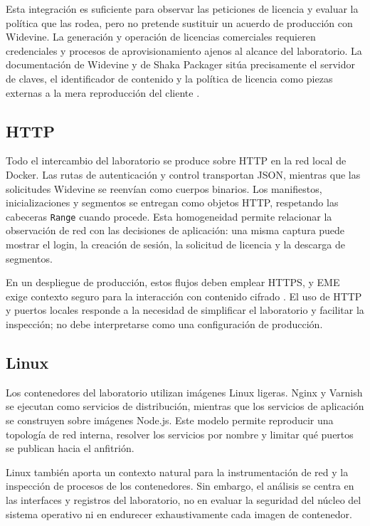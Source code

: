 Esta integración es suficiente para observar las peticiones de licencia y evaluar la política que las rodea, pero no pretende sustituir un acuerdo de producción con Widevine. La generación y operación de licencias comerciales requieren credenciales y procesos de aprovisionamiento ajenos al alcance del laboratorio. La documentación de Widevine y de Shaka Packager sitúa precisamente el servidor de claves, el identificador de contenido y la política de licencia como piezas externas a la mera reproducción del cliente \cite{widevine2024,shaka-packager-drm}.

\subsection{HTTP}

Todo el intercambio del laboratorio se produce sobre HTTP en la red local de Docker. Las rutas de autenticación y control transportan JSON, mientras que las solicitudes Widevine se reenvían como cuerpos binarios. Los manifiestos, inicializaciones y segmentos se entregan como objetos HTTP, respetando las cabeceras \nolinkurl{Range} cuando procede. Esta homogeneidad permite relacionar la observación de red con las decisiones de aplicación: una misma captura puede mostrar el login, la creación de sesión, la solicitud de licencia y la descarga de segmentos.

En un despliegue de producción, estos flujos deben emplear HTTPS, y EME exige contexto seguro para la interacción con contenido cifrado \cite{w3ceme2026}. El uso de HTTP y puertos locales responde a la necesidad de simplificar el laboratorio y facilitar la inspección; no debe interpretarse como una configuración de producción.

\subsection{Linux}

Los contenedores del laboratorio utilizan imágenes Linux ligeras. Nginx y Varnish se ejecutan como servicios de distribución, mientras que los servicios de aplicación se construyen sobre imágenes Node.js. Este modelo permite reproducir una topología de red interna, resolver los servicios por nombre y limitar qué puertos se publican hacia el anfitrión.

Linux también aporta un contexto natural para la instrumentación de red y la inspección de procesos de los contenedores. Sin embargo, el análisis se centra en las interfaces y registros del laboratorio, no en evaluar la seguridad del núcleo del sistema operativo ni en endurecer exhaustivamente cada imagen de contenedor.

